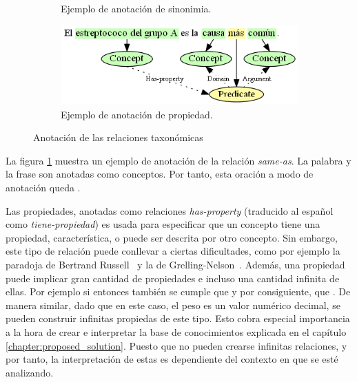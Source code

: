 \begin{figure}[H]
\begin{subfigure}{4.2in}
		\caption{Ejemplo de anotación de sinonimia.}
		\vspace{0.4in}
		\label{fig:annotation_example_same_as}
	\end{subfigure}
	\begin{subfigure}{3.9in}
		\includegraphics[width=\linewidth]{graphics/annotation_example_has_property.png}
		\caption{Ejemplo de anotación de propiedad.}
		\label{fig:annotation_example_has_property}
	\end{subfigure}
	\caption{Anotación de las relaciones taxonómicas}
\end{figure}

La figura \ref{fig:annotation_example_same_as} muestra un ejemplo de anotación de la relación \textit{same-as}. La palabra  y la frase  son anotadas como conceptos. Por tanto, esta oración a modo de anotación queda .

Las propiedades, anotadas como relaciones \textit{has-property} (traducido al español como \textit{tiene-propiedad}) es usada para especificar que un concepto tiene una propiedad, característica, o puede ser descrita por otro concepto. Sin embargo, este tipo de relación puede conllevar a ciertas dificultades, como por ejemplo la paradoja de Bertrand Russell~\cite{ref:15} y la de Grelling-Nelson~\cite{ref:16}. Además, una propiedad puede implicar gran cantidad de propiedades e incluso una cantidad infinita de ellas. Por ejemplo si  entonces también se cumple que  y por consiguiente, que . De manera similar, dado que en este caso, el peso es un valor numérico decimal, se pueden construir infinitas propiedas de este tipo. Esto cobra especial importancia a la hora de crear e interpretar la base de conocimientos explicada en el capítulo \ref{chapter:proposed_solution}. Puesto que no pueden crearse infinitas relaciones, y por tanto, la interpretación de estas es dependiente del contexto en que se esté analizando.

